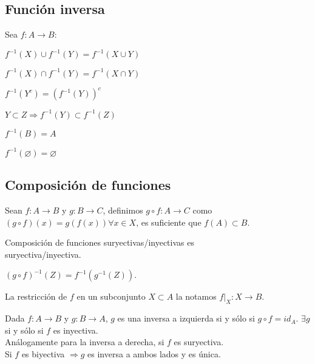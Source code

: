 \subsection{Función inversa}

Sea $f: A \to B$:

\begin{prop}
    $f^{-1}(X) \cup f^{-1}(Y) = f^{-1}(X \cup Y)$
\end{prop}

\begin{prop}
    $f^{-1}(X) \cap f^{-1}(Y) = f^{-1}(X \cap Y)$
\end{prop}

\begin{prop}
    $f^{-1}(Y^c) = (f^{-1}(Y))^c$
\end{prop}

\begin{prop}
    $Y \subset Z \Rightarrow f^{-1}(Y) \subset f^{-1}(Z)$
\end{prop}

\begin{prop}
    $f^{-1}(B) = A$
\end{prop}

\begin{prop}
    $f^{-1}(\varnothing) = \varnothing$
\end{prop}

\subsection{Composición de funciones}

Sean $f: A \to B$ y $g: B \to C$, definimos $g \circ f: A \to C$ como $(g \circ f)(x) = g(f(x)) \forall x \in X$, es suficiente que $f(A) \subset B$.

\begin{prop}
    Composición de funciones suryectivas/inyectivas es \\ suryectiva/inyectiva.
\end{prop}

\begin{prop}
    $(g \circ f)^{-1}(Z) = f^{-1}(g^{-1}(Z))$.
\end{prop}

\begin{definition}
    La restricción de $f$ en un subconjunto $X \subset A$ la notamos $f|_X: X \to B$.
\end{definition}

\begin{definition}
    Dada $f: A \to B$ y $g: B \to A$, $g$ es una inversa a izquierda si y sólo si $g \circ f = id_A$. $\exists g$ si y sólo si $f$ es inyectiva. \\
    Análogamente para la inversa a derecha, si $f$ es suryectiva. \\
    Si $f$ es biyectiva $\Rightarrow g$ es inversa a ambos lados y es única.
\end{definition}

